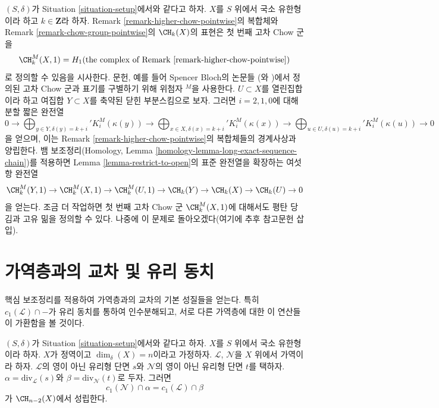 \begin{remark}
\label{remark-higher-chow}
$(S, \delta)$가 Situation \ref{situation-setup}에서와 같다고 하자.
$X$를 $S$ 위에서 국소 유한형이라 하고 $k \in \mathbf{Z}$라 하자.
Remark \ref{remark-higher-chow-pointwise}의 복합체와 Remark
\ref{remark-chow-group-pointwise}의 $\CH_k(X)$의 표현은 첫 번째 고차
Chow 군을
$$
\CH^M_k(X, 1) =
H_1(\text{the complex of Remark \ref{remark-higher-chow-pointwise}})
$$
로 정의할 수 있음을 시사한다. 문헌, 예를 들어 Spencer Bloch의 논문들
(\cite{Bloch}와 \cite{Bloch-moving})에서 정의된 고차 Chow 군과 표기를
구별하기 위해 위첨자 ${}^M$을 사용한다. $U \subset X$를 열린집합이라
하고 여집합 $Y \subset X$를 축약된 닫힌 부분스킴으로 보자. 그러면
$i = 2, 1, 0$에 대해 분할 짧은 완전열
$$
0 \to
\bigoplus\nolimits_{y \in Y, \delta(y) = k + i}' K_i^M(\kappa(y)) \to
\bigoplus\nolimits_{x \in X, \delta(x) = k + i}' K_i^M(\kappa(x)) \to
\bigoplus\nolimits_{u \in U, \delta(u) = k + i}' K_i^M(\kappa(u)) \to 0
$$
을 얻으며, 이는 Remark \ref{remark-higher-chow-pointwise}의 복합체들의
경계사상과 양립한다. 뱀 보조정리(Homology, Lemma
\ref{homology-lemma-long-exact-sequence-chain})를 적용하면 Lemma
\ref{lemma-restrict-to-open}의 표준 완전열을 확장하는 여섯 항 완전열
$$
\CH^M_k(Y, 1) \to \CH^M_k(X, 1) \to \CH^M_k(U, 1) \to
\CH_k(Y) \to \CH_k(X) \to \CH_k(U) \to 0
$$
을 얻는다. 조금 더 작업하면 첫 번째 고차 Chow 군
$\CH^M_k(X, 1)$에 대해서도 평탄 당김과 고유 밂을 정의할 수 있다.
나중에 이 문제로 돌아오겠다(여기에 추후 참고문헌 삽입).
\end{remark}






\section{가역층과의 교차 및 유리 동치}
\label{section-commutativity}

\noindent
핵심 보조정리를 적용하여 가역층과의 교차의 기본 성질들을 얻는다.
특히 $c_1(\mathcal{L}) \cap -$가 유리 동치를 통하여 인수분해되고,
서로 다른 가역층에 대한 이 연산들이 가환함을 볼 것이다.

\begin{lemma}
\label{lemma-commutativity-on-integral}
$(S, \delta)$가 Situation \ref{situation-setup}에서와 같다고 하자.
$X$를 $S$ 위에서 국소 유한형이라 하자. $X$가 정역이고
$\dim_\delta(X) = n$이라고 가정하자. $\mathcal{L}$, $\mathcal{N}$을
$X$ 위에서 가역이라 하자. $\mathcal{L}$의 영이 아닌 유리형 단면 $s$와
$\mathcal{N}$의 영이 아닌 유리형 단면 $t$를 택하자.
$\alpha = \text{div}_\mathcal{L}(s)$와
$\beta = \text{div}_\mathcal{N}(t)$로 두자. 그러면
$$
c_1(\mathcal{N}) \cap \alpha
=
c_1(\mathcal{L}) \cap \beta
$$
가 $\CH_{n - 2}(X)$에서 성립한다.
\end{lemma}

